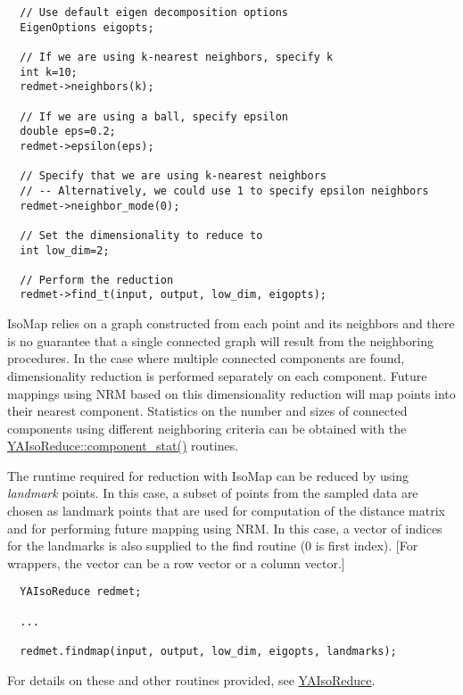 \footnotesize\begin{verbatim}  // Use default eigen decomposition options
  EigenOptions eigopts;

  // If we are using k-nearest neighbors, specify k
  int k=10;
  redmet->neighbors(k);
  
  // If we are using a ball, specify epsilon
  double eps=0.2;
  redmet->epsilon(eps);
  
  // Specify that we are using k-nearest neighbors
  // -- Alternatively, we could use 1 to specify epsilon neighbors
  redmet->neighbor_mode(0);

  // Set the dimensionality to reduce to
  int low_dim=2;
  
  // Perform the reduction
  redmet->find_t(input, output, low_dim, eigopts);
\end{verbatim}
\normalsize


Iso\-Map relies on a graph constructed from each point and its neighbors and there is no guarantee that a single connected graph will result from the neighboring procedures. In the case where multiple connected components are found, dimensionality reduction is performed separately on each component. Future mappings using NRM based on this dimensionality reduction will map points into their nearest component. Statistics on the number and sizes of connected components using different neighboring criteria can be obtained with the \hyperlink{class_y_a_iso_reduce_a15}{YAIso\-Reduce::component\_\-stat()} routines.

The runtime required for reduction with Iso\-Map can be reduced by using {\em landmark\/} points. In this case, a subset of points from the sampled data are chosen as landmark points that are used for computation of the distance matrix and for performing future mapping using NRM. In this case, a vector of indices for the landmarks is also supplied to the find routine (0 is first index). \mbox{[}For wrappers, the vector can be a row vector or a column vector.\mbox{]}



\footnotesize\begin{verbatim}  YAIsoReduce redmet;
  
  ...
  
  redmet.findmap(input, output, low_dim, eigopts, landmarks);
\end{verbatim}
\normalsize


For details on these and other routines provided, see \hyperlink{class_y_a_iso_reduce}{YAIso\-Reduce}.

